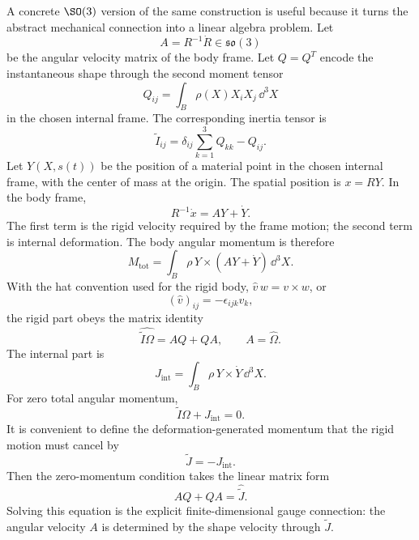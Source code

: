 A concrete \(\SO(3)\) version of the same construction is useful because it
turns the abstract mechanical connection into a linear algebra problem. Let
\[
  A=R^{-1}\dot R\in\mathfrak{so}(3)
\]
be the angular velocity matrix of the body frame. Let \(Q=Q^T\) encode the
instantaneous shape through the second moment tensor
\[
  Q_{ij}=\int_B\rho(X)X_iX_j\,\dd^3X
\]
in the chosen internal frame. The corresponding inertia tensor is
\[
  \widetilde I_{ij}
  =
  \delta_{ij}\sum_{k=1}^3Q_{kk}-Q_{ij}.
\]
Let \(Y(X,s(t))\) be the position of a material point in the chosen internal
frame, with the center of mass at the origin. The spatial position is
\(x=RY\). In the body frame,
\[
  R^{-1}\dot x=A Y+\dot Y.
\]
The first term is the rigid velocity required by the frame motion; the second
term is internal deformation. The body angular momentum is therefore
\[
  M_{\mathrm{tot}}
  =
  \int_B\rho\,Y\times(AY+\dot Y)\,\dd^3X.
\]
With the hat convention used for the rigid body,
\(\widehat v\,w=v\times w\), or
\[
  (\widehat v)_{ij}=-\epsilon_{ijk}v_k,
\]
the rigid part obeys the matrix identity
\[
  \widehat{\widetilde I\Omega}=AQ+QA,
  \qquad A=\widehat\Omega.
\]
The internal part is
\[
  J_{\mathrm{int}}
  =
  \int_B\rho\,Y\times\dot Y\,\dd^3X.
\]
For zero total angular momentum,
\[
  \widetilde I\Omega+J_{\mathrm{int}}=0.
\]
It is convenient to define the deformation-generated momentum that the rigid
motion must cancel by
\[
  \widetilde J=-J_{\mathrm{int}}.
\]
Then the zero-momentum condition takes the linear matrix form
\[
  \boxed{
  AQ+QA=\widehat{\widetilde J}.
  }
\]
Solving this equation is the explicit finite-dimensional gauge connection:
the angular velocity \(A\) is determined by the shape velocity through
\(\widetilde J\).

